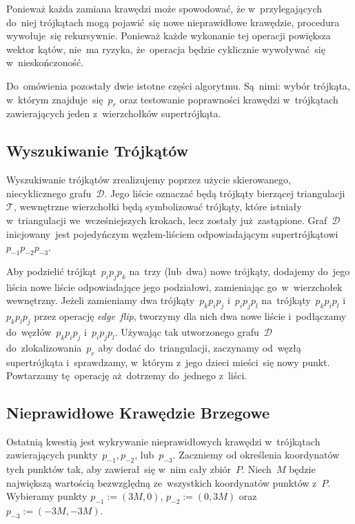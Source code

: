 \documentclass[skorowidz,autorrok,backref,xodstep,oswiadczenie]{wmimgr}
\begin{document}
Ponieważ każda zamiana krawędzi może spowodować, że w~przylegających do~niej trójkątach mogą pojawić~się nowe nieprawidłowe krawędzie, procedura wywołuje~się rekursywnie. Ponieważ każde wykonanie tej operacji powiększa wektor kątów, nie~ma ryzyka, że~operacja będzie cyklicznie wywoływać~się w~nieskończoność.

Do~omówienia pozostały dwie istotne części algorytmu. Są~nimi: wybór trójkąta, w~którym znajduje~się~$p_{r}$ oraz testowanie poprawności krawędzi w~trójkątach zawierających jeden z~wierzchołków supertrójkąta.

\subsection{Wyszukiwanie Trójkątów}

Wyszukiwanie trójkątów zrealizujemy poprzez użycie skierowanego, niecyklicznego grafu~$\mathcal{D}$. Jego liście oznaczać będą trójkąty bierzącej triangulacji~$\mathcal{T}$, wewnętrzne wierzchołki będą symbolizować trójkąty, które istniały w~triangulacji we~wcześniejszych krokach, lecz zostały już~zastąpione. Graf~$\mathcal{D}$ inicjowany~jest pojedyńczym węzłem-liściem odpowiadającym supertrójkątowi~$p_{-1} p_{-2} p_{-3}$.

Aby podzielić trójkąt~$p_{i} p_{j} p_{k}$ na~trzy (lub~dwa) nowe trójkąty, dodajemy do~jego liścia nowe liście odpowiadające jego podziałowi, zamieniając go~w~wierzchołek wewnętrzny. Jeżeli zamieniamy dwa trójkąty~$p_{k} p_{i} p_{j}$ i~$p_{i} p_{j} p_{l}$ na~trójkąty~$p_{k} p_{i} p_{l}$ i~$p_{k} p_{l} p_{j}$ przez operację \emph{edge~flip}, tworzymy dla nich dwa nowe liście i~podłączamy do~węzłów~$p_{k} p_{i} p_{j}$ i~$p_{i} p_{j} p_{l}$. Używając tak utworzonego grafu~$\mathcal{D}$ do~zlokalizowania~$p_{r}$ aby dodać do~triangulacji, zaczynamy od~węzłą supertrójkąta i~sprawdzamy, w~którym z~jego dzieci mieści~się nowy punkt. Powtarzamy tę~operację aż~dotrzemy do~jednego z~liści.

\subsection{Nieprawidłowe Krawędzie Brzegowe}

Ostatnią kwestią jest wykrywanie nieprawidłowych krawędzi w~trójkątach zawierających punkty~$p_{-1}, p_{-2}$, lub~$p_{-3}$. Zaczniemy od określenia koordynatów tych punktów tak, aby zawierał~się w~nim cały zbiór~$P$. Niech~$M$ będzie największą wartością bezwzględną ze~wszystkich koordynatów punktów z~$P$. Wybieramy punkty $p_{-1} := (3M, 0)$, $p_{-2} := (0, 3M)$ oraz $p_{-3} := (-3M, -3M)$.
\end{document}
